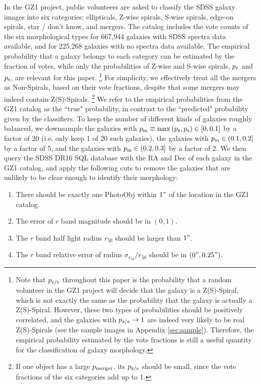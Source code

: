 \documentclass[twocolumn]{aastex631}
\begin{document}
In the GZ1 project, public volunteers are asked to classify the SDSS galaxy images into six categories: ellipticals, Z-wise spirals, S-wise spirals, edge-on spirals, star / don't know, and mergers.
The catalog includes the vote counts of the six morphological types for 667,944 galaxies with SDSS spectra data available, and for 225,268 galaxies with no spectra data available.
The empirical probability that a galaxy belongs to each category can be estimated by the fraction of votes, while only the probabilities of Z-wise and S-wise spirals, $p_{\rm z}$ and $p_{\rm s}$, are relevant for this paper.
\footnote{Note that $p_{\rm z/s}$ throughout this paper is the probability that a random volunteer in the GZ1 project will decide that the galaxy is a Z(S)-Spiral, which is not exactly the same as the probability that the galaxy is actually a Z(S)-Spiral.
However, these two types of probabilities should be positively correlated, and the galaxies with $p_{\rm z/s}\to1$ are indeed very likely to be real Z(S)-Spirals (see the sample images in Appendix \ref{sec:sample}).
Therefore, the empirical probability estimated by the vote fractions is still a useful quantity for the classification of galaxy morphology.}
For simplicity, we effectively treat all the mergers as Non-Spirals, based on their vote fractions, despite that some mergers may indeed contain Z(S)-Spirals.
\footnote{If one object has a large $p_{\rm merger}$, its $p_{\rm z/s}$ should be small, since the vote fractions of the six categories add up to 1.}
We refer to the empirical probabilities from the GZ1 catalog as the ``true" probability, in contrast to the ``predicted" probability given by the classifiers.
To keep the number of different kinds of galaxies roughly balanced, we downsample the galaxies with $p_{\rm m}\equiv\max\,(p_{\rm z},p_{\rm s}) \in [0,0.1]$ by a factor of 20 (i.e. only keep 1 of 20 such galaxies), the galaxies with $p_{\rm m} \in (0.1,0.2]$ by a factor of 5, and the galaxies with $p_{\rm m} \in (0.2,0.3]$ by a factor of 2.
We then query the SDSS DR16 SQL database with the RA and Dec of each galaxy in the GZ1 catalog, and apply the following cuts to remove the galaxies that are unlikely to be clear enough to identify their morphology:
\begin{enumerate}
    \item There should be exactly one PhotoObj within $1"$ of the location in the GZ1 catalog.
    \item The error of $r$ band magnitude should be in $(0,1)$.
    \item The $r$ band half light radius $r_{50}$ should be larger than $1"$.
    \item The $r$ band relative error of radius $\sigma_{r_{50}}/r_{50}$ should be in $(0",0.25")$.
\end{enumerate}
\end{document}
